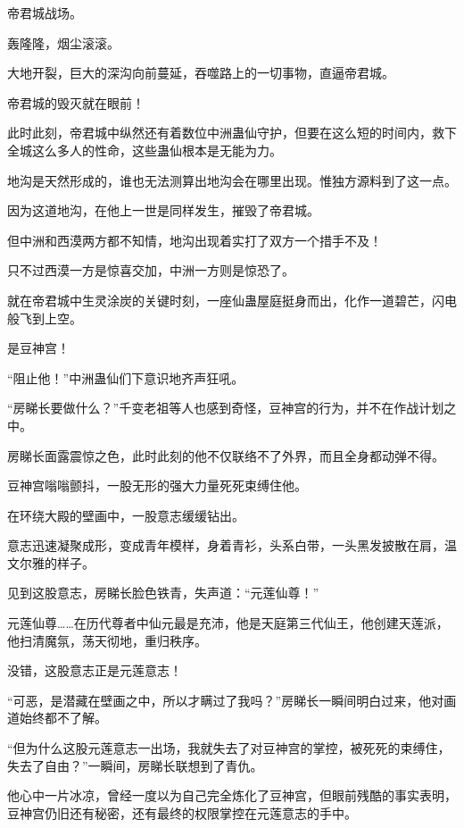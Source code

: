 
\begin{this_body}



帝君城战场。

轰隆隆，烟尘滚滚。

大地开裂，巨大的深沟向前蔓延，吞噬路上的一切事物，直逼帝君城。

帝君城的毁灭就在眼前！

此时此刻，帝君城中纵然还有着数位中洲蛊仙守护，但要在这么短的时间内，救下全城这么多人的性命，这些蛊仙根本是无能为力。

地沟是天然形成的，谁也无法测算出地沟会在哪里出现。惟独方源料到了这一点。

因为这道地沟，在他上一世是同样发生，摧毁了帝君城。

但中洲和西漠两方都不知情，地沟出现着实打了双方一个措手不及！

只不过西漠一方是惊喜交加，中洲一方则是惊恐了。

就在帝君城中生灵涂炭的关键时刻，一座仙蛊屋庭挺身而出，化作一道碧芒，闪电般飞到上空。

是豆神宫！

“阻止他！”中洲蛊仙们下意识地齐声狂吼。

“房睇长要做什么？”千变老祖等人也感到奇怪，豆神宫的行为，并不在作战计划之中。

房睇长面露震惊之色，此时此刻的他不仅联络不了外界，而且全身都动弹不得。

豆神宫嗡嗡颤抖，一股无形的强大力量死死束缚住他。

在环绕大殿的壁画中，一股意志缓缓钻出。

意志迅速凝聚成形，变成青年模样，身着青衫，头系白带，一头黑发披散在肩，温文尔雅的样子。

见到这股意志，房睇长脸色铁青，失声道：“元莲仙尊！”

元莲仙尊……在历代尊者中仙元最是充沛，他是天庭第三代仙王，他创建天莲派，他扫清魔氛，荡天彻地，重归秩序。

没错，这股意志正是元莲意志！

“可恶，是潜藏在壁画之中，所以才瞒过了我吗？”房睇长一瞬间明白过来，他对画道始终都不了解。

“但为什么这股元莲意志一出场，我就失去了对豆神宫的掌控，被死死的束缚住，失去了自由？”一瞬间，房睇长联想到了青仇。

他心中一片冰凉，曾经一度以为自己完全炼化了豆神宫，但眼前残酷的事实表明，豆神宫仍旧还有秘密，还有最终的权限掌控在元莲意志的手中。


\end{this_body}
